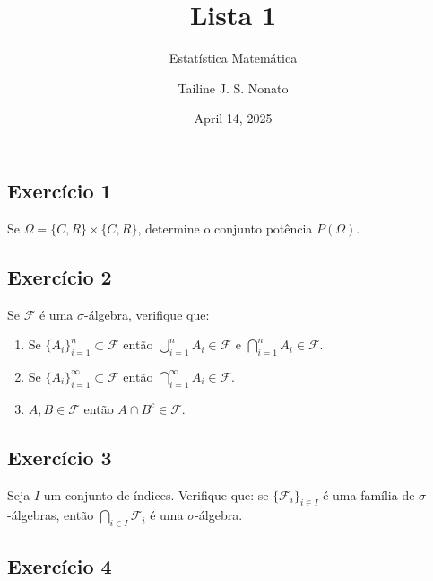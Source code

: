 \documentclass[
  letterpaper,
  DIV=11,
  numbers=noendperiod]{scrartcl}
\title{Lista 1}
\subtitle{Estatística Matemática}
\author{Tailine J. S. Nonato}
\date{April 14, 2025}
\begin{document}
\maketitle
\ifdefined\Shaded\renewenvironment{Shaded}{\begin{tcolorbox}[interior hidden, sharp corners, breakable, borderline west={3pt}{0pt}{shadecolor}, boxrule=0pt, enhanced, frame hidden]}{\end{tcolorbox}}\fi

\hypertarget{exercuxedcio-1}{%
\subsection{Exercício 1}\label{exercuxedcio-1}}

Se \(\Omega = \{C, R\} \times \{C, R\}\), determine o conjunto potência
\(P(\Omega)\).

\hypertarget{exercuxedcio-2}{%
\subsection{Exercício 2}\label{exercuxedcio-2}}

Se \(\mathcal{F}\) é uma \(\sigma\)-álgebra, verifique que:

\begin{enumerate}
\def\labelenumi{(\alph{enumi})}
\item
  Se \(\{A_i\}_{i=1}^n \subset \mathcal{F}\) então
  \(\bigcup_{i=1}^n A_i \in \mathcal{F}\) e
  \(\bigcap_{i=1}^n A_i \in \mathcal{F}\).
\item
  Se \(\{A_i\}_{i=1}^\infty \subset \mathcal{F}\) então
  \(\bigcap_{i=1}^\infty A_i \in \mathcal{F}\).
\item
  \(A, B \in \mathcal{F}\) então \(A \cap B^c \in \mathcal{F}\).
\end{enumerate}

\hypertarget{exercuxedcio-3}{%
\subsection{Exercício 3}\label{exercuxedcio-3}}

Seja \(I\) um conjunto de índices. Verifique que: se
\(\{\mathcal{F}_i\}_{i\in I}\) é uma família de \(\sigma\)-álgebras,
então \(\bigcap_{i\in I}\mathcal{F}_i\) é uma \(\sigma\)-álgebra.

\hypertarget{exercuxedcio-4}{%
\subsection{Exercício 4}\label{exercuxedcio-4}}
\end{document}
